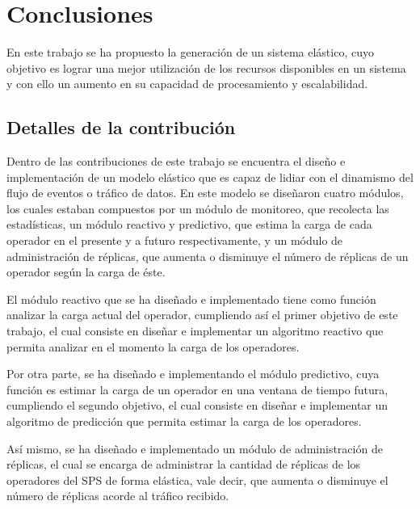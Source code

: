 \chapter{Conclusiones}
\label{cap:conclusiones}
En este trabajo se ha propuesto la generaci\'on de un sistema el\'astico, cuyo objetivo es lograr una mejor utilizaci\'on de los recursos disponibles \normalsize{en un sistema} y con ello un aumento en su capacidad de procesamiento y escalabilidad.

\section{Detalles de la contribuci\'on}
Dentro de las contribuciones de este trabajo se encuentra el dise\~no e implementaci\'on de un modelo el\'astico que es capaz de lidiar con el dinamismo del flujo de eventos o tr\'afico de datos. En este modelo se dise\~naron cuatro m\'odulos, los cuales estaban compuestos por un m\'odulo de monitoreo, que recolecta las estad\'isticas, un m\'odulo reactivo y predictivo, que estima la carga de cada operador en el presente y a futuro respectivamente, y un m\'odulo de administraci\'on de r\'eplicas, que aumenta o disminuye el n\'umero de r\'eplicas de un operador seg\'un la carga de \'este.

El m\'odulo reactivo que se ha dise\~nado e implementado tiene como funci\'on analizar la carga actual del operador, cumpliendo as\'i el primer objetivo de este trabajo, el cual consiste en dise\~nar e implementar un algoritmo reactivo que permita analizar en el momento la carga de los operadores.

Por otra parte, se ha dise\~nado e implementando el m\'odulo predictivo, cuya funci\'on es estimar la carga de un operador en una ventana de tiempo futura, cumpliendo el segundo objetivo, el cual consiste en dise\~nar e implementar un algoritmo de predicci\'on que permita estimar la carga de los operadores.

As\'i mismo, se ha dise\~nado e implementado un m\'odulo de administraci\'on de r\'eplicas, el cual se encarga de administrar la cantidad de r\'eplicas de los operadores del SPS de forma el\'astica, vale decir, que aumenta o disminuye el n\'umero de r\'eplicas acorde al tr\'afico recibido.


